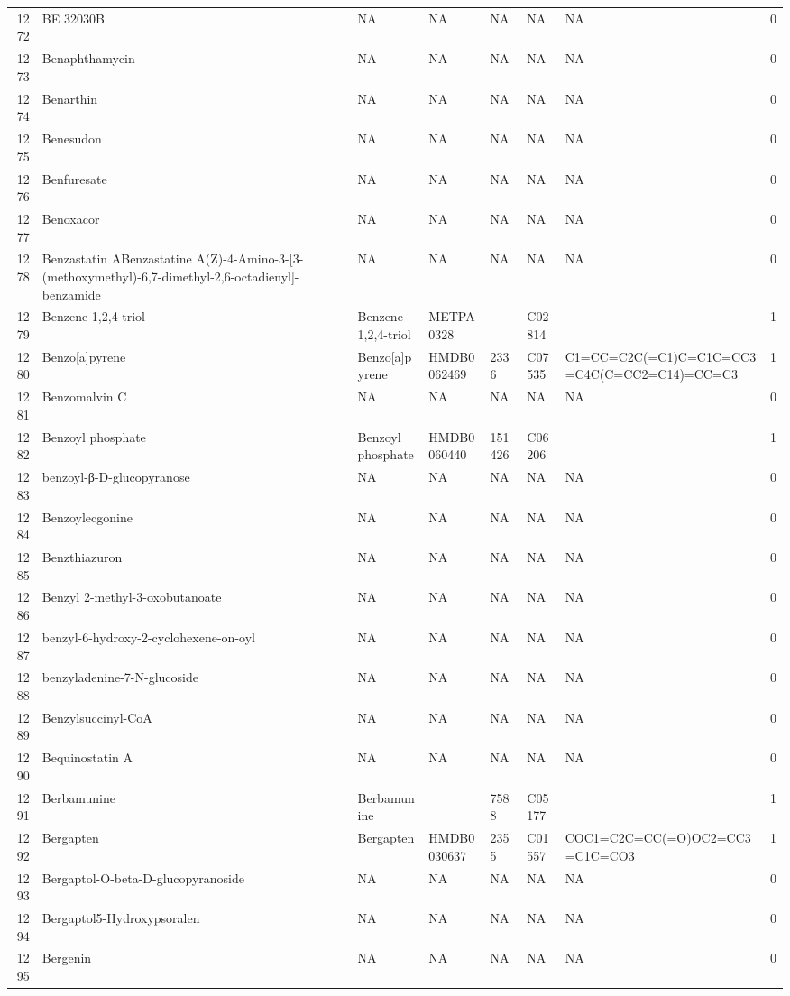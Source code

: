 \documentclass[a4paper]{article}
\begin{document}
\begin{longtable}{rlllllll}
  1272 & BE 32030B & NA & NA & NA & NA & NA & 0 \\ 
  1273 & Benaphthamycin & NA & NA & NA & NA & NA & 0 \\ 
  1274 & Benarthin & NA & NA & NA & NA & NA & 0 \\ 
  1275 & Benesudon & NA & NA & NA & NA & NA & 0 \\ 
  1276 & Benfuresate & NA & NA & NA & NA & NA & 0 \\ 
  1277 & Benoxacor & NA & NA & NA & NA & NA & 0 \\ 
  1278 & Benzastatin ABenzastatine A(Z)-4-Amino-3-[3-(methoxymethyl)-6,7-dimethyl-2,6-octadienyl]-benzamide & NA & NA & NA & NA & NA & 0 \\ 
  1279 & Benzene-1,2,4-triol & Benzene-1,2,4-triol & METPA0328 &  & C02814 &  & 1 \\ 
  1280 & Benzo[a]pyrene & Benzo[a]pyrene & HMDB0062469 & 2336 & C07535 & C1=CC=C2C(=C1)C=C1C=CC3=C4C(C=CC2=C14)=CC=C3 & 1 \\ 
  1281 & Benzomalvin C & NA & NA & NA & NA & NA & 0 \\ 
  1282 & Benzoyl phosphate & Benzoyl phosphate & HMDB0060440 & 151426 & C06206 &  & 1 \\ 
  1283 & benzoyl-β-D-glucopyranose & NA & NA & NA & NA & NA & 0 \\ 
  1284 & Benzoylecgonine & NA & NA & NA & NA & NA & 0 \\ 
  1285 & Benzthiazuron & NA & NA & NA & NA & NA & 0 \\ 
  1286 & Benzyl 2-methyl-3-oxobutanoate & NA & NA & NA & NA & NA & 0 \\ 
  1287 & benzyl-6-hydroxy-2-cyclohexene-on-oyl & NA & NA & NA & NA & NA & 0 \\ 
  1288 & benzyladenine-7-N-glucoside & NA & NA & NA & NA & NA & 0 \\ 
  1289 & Benzylsuccinyl-CoA & NA & NA & NA & NA & NA & 0 \\ 
  1290 & Bequinostatin A & NA & NA & NA & NA & NA & 0 \\ 
  1291 & Berbamunine & Berbamunine &  & 7588 & C05177 &  & 1 \\ 
  1292 & Bergapten & Bergapten & HMDB0030637 & 2355 & C01557 & COC1=C2C=CC(=O)OC2=CC3=C1C=CO3 & 1 \\ 
  1293 & Bergaptol-O-beta-D-glucopyranoside & NA & NA & NA & NA & NA & 0 \\ 
  1294 & Bergaptol5-Hydroxypsoralen & NA & NA & NA & NA & NA & 0 \\ 
  1295 & Bergenin & NA & NA & NA & NA & NA & 0 \\ 

\end{longtable}
\end{document}

